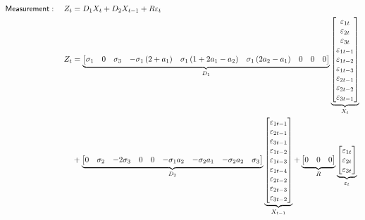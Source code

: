 \documentclass[a4paper,12pt]{article}
\begin{document}
\begin{align}
\mathsf{Measurement}:\quad Z_{t}& =D_{1}X_{t}+D_{2}X_{t-1}+R\varepsilon _{t}
\notag \\
Z_{t}& =\underbrace{%
\begin{bmatrix}
\sigma _{1} & 0 & \sigma _{3} & -\sigma _{1}\left( 2+a_{1}\right)  & \sigma
_{1}\left( 1+2a_{1}-a_{2}\right)  & \sigma _{1}\left( 2a_{2}-a_{1}\right)  & 
0 & 0 & 0%
\end{bmatrix}%
}_{D_{1}}\underbrace{%
\begin{bmatrix}
\varepsilon _{1t} \\ 
\varepsilon _{2t} \\ 
\varepsilon _{3t} \\ 
\varepsilon _{1t-1} \\ 
\varepsilon _{1t-2} \\ 
\varepsilon _{1t-3} \\ 
\varepsilon _{2t-1} \\ 
\varepsilon _{2t-2} \\ 
\varepsilon _{3t-1}%
\end{bmatrix}%
}_{X_{t}} \\
& +\underbrace{%
\begin{bmatrix}
0 & \sigma _{2} & -2\sigma _{3} & 0 & 0 & -\sigma _{1}a_{2} & -\sigma
_{2}a_{1} & -\sigma _{2}a_{2} & \sigma _{3}%
\end{bmatrix}%
}_{D_{2}}\underbrace{%
\begin{bmatrix}
\varepsilon _{1t-1} \\ 
\varepsilon _{2t-1} \\ 
\varepsilon _{3t-1} \\ 
\varepsilon _{1t-2} \\ 
\varepsilon _{1t-3} \\ 
\varepsilon _{1t-4} \\ 
\varepsilon _{2t-2} \\ 
\varepsilon _{2t-3} \\ 
\varepsilon _{3t-2}%
\end{bmatrix}%
}_{X_{t-1}}+\underbrace{%
\begin{bmatrix}
0 & 0 & 0%
\end{bmatrix}%
}_{R}\underbrace{%
\begin{bmatrix}
\varepsilon _{1t} \\ 
\varepsilon _{2t} \\ 
\varepsilon _{3t}%
\end{bmatrix}%
}_{\varepsilon _{t}}
\end{align}
\end{document}
